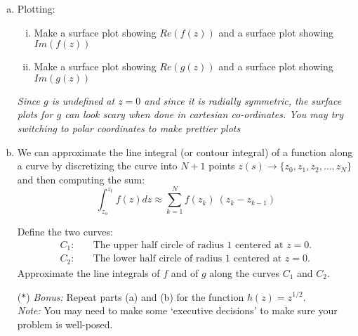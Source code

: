 \begin{enumerate}[(a)]
    \item Plotting:
    \begin{enumerate}[i.] 
        \item Make a surface plot showing $Re(f(z))$ and a surface plot showing $Im(f(z))$
        \item Make a surface plot showing $Re(g(z))$ and a surface plot showing $Im(g(z))$
    \end{enumerate}
    \textit{Since $g$ is undefined at $z = 0$ and since it is radially symmetric, the surface plots for $g$ can look scary when done in cartesian co-ordinates. You may try switching to polar coordinates to make prettier plots}
    \item     We can approximate the line integral (or contour integral) of a function along a curve by discretizing the curve into $N+1$ points $z(s) \to \{z_0, z_1, z_2, \dots, z_N\}$ and then computing the sum:
    \begin{equation*}
    \int_{z_o}^{z_t} f(z) dz \approx \sum_{k = 1}^{N} f(z_k) \ (z_{k} - z_{k-1})
    \end{equation*}
    \begin{minipage}{.7\textwidth}
    Define the two curves:
    \begin{align*}
    C_1:&  \quad \text{The upper half circle of radius 1 centered at $z=0$.}\\
    C_2:&  \quad \text{The lower half circle of radius 1 centered at $z=0$.}
    \end{align*}
    Approximate the line integrals of $f$ and of $g$ along the curves $C_1$ and $C_2$.
    \end{minipage}
    \begin{minipage}{.29\textwidth}
    \begin{center}
    \end{center}
    \end{minipage}
    \item[($\ast$)] \textit{Bonus:} Repeat parts (a) and (b) for the function $h(z) = z^{1/2}$.\\
    \textit{Note:} You may need to make some `executive decisions' to make sure your problem is well-posed.
\end{enumerate}

